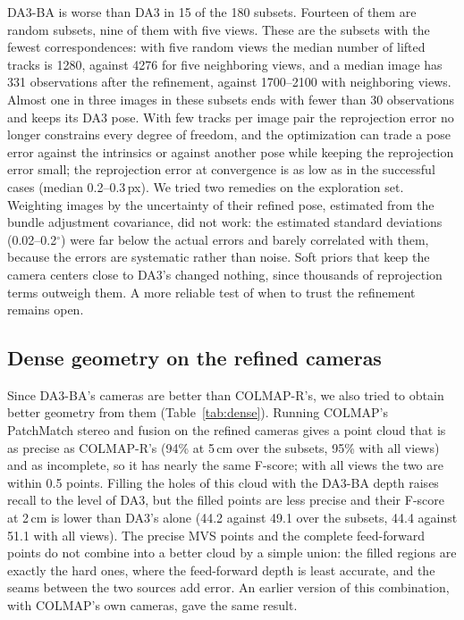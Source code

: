 \documentclass[10pt,twocolumn,letterpaper]{article}
\begin{document}
DA3-BA is worse than DA3 in 15 of the 180 subsets. Fourteen of them are random subsets, nine of them with five
views. These are the subsets with the fewest correspondences: with five random views the median number of
lifted tracks is 1280, against 4276 for five neighboring views, and a median image has 331 observations
after the refinement, against 1700--2100 with neighboring views. Almost one in three images in these subsets
ends with fewer than 30 observations and keeps its DA3 pose. With few tracks per image pair the reprojection error no
longer constrains every degree of freedom, and the optimization can trade a pose error against the intrinsics or
against another pose while keeping the reprojection error small; the reprojection error at convergence is as
low as in the successful cases (median 0.2--0.3\,px). We tried two remedies on the exploration set. Weighting
images by the uncertainty of their refined pose, estimated from the bundle adjustment covariance, did not work:
the estimated standard deviations (0.02--0.2$^\circ$) were far below the actual errors and barely correlated
with them, because the errors are systematic rather than noise. Soft priors that keep the camera centers close
to DA3's changed nothing, since thousands of reprojection terms outweigh them. A more reliable test of when to
trust the refinement remains open.

\subsection{Dense geometry on the refined cameras}
\label{sec:dense}

\begin{table}[t]
\centering

\caption{Dense geometry with the refined cameras (\%): DA3 depth (DA3-BA), COLMAP PatchMatch and fusion on the
refined cameras (+ MVS), and the MVS cloud with its holes filled by the DA3-BA depth (+ fill). Subsets: the 123
subsets where the dense stage finished.}
\label{tab:dense}
\end{table}

Since DA3-BA's cameras are better than COLMAP-R's, we also tried to obtain better geometry from them
(Table~\ref{tab:dense}). Running COLMAP's PatchMatch stereo and fusion on the refined cameras gives a point cloud
that is as precise as COLMAP-R's (94\% at 5\,cm over the subsets, 95\% with all views) and as incomplete, so it has nearly the same F-score; with
all views the two are within 0.5 points. Filling the holes of this cloud with the DA3-BA depth raises recall to
the level of DA3, but the filled points are less precise and their F-score at 2\,cm is lower than DA3's alone
(44.2 against 49.1 over the subsets, 44.4 against 51.1 with all views). The precise MVS points and the complete
feed-forward points do not combine into a better cloud by a simple union: the filled regions are exactly the hard
ones, where the feed-forward depth is least accurate, and the seams between the two sources add error. An
earlier version of this combination, with COLMAP's own cameras, gave the same result.
\end{document}
